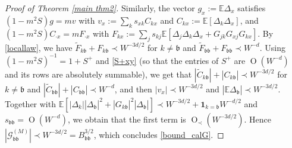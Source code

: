 \documentclass{article}
\newcommand{\1}{\mathds{1}}
\numberwithin{equation}{section}
\newcommand{\fb}{{\mathfrak b}}
\renewcommand{\cal}{\mathcal}
\newcommand{\wt}{\widetilde}
\newcommand{\E}{\mathbb{E}}
\DeclareMathOperator{\OO}{O}
\theoremstyle{plain} %
\theoremstyle{remark}
\begin{document}
\begin{proof}[Proof of Theorem \ref{main thm2}]
Similarly, the vector $g_x:=\E\Delta_x$ satisfies $(1-m^2S)g=mv$ with $v_x:=\sum_k s_{xk}C_{kx}$ and $C_{kx}:=\E[\Delta_k\Delta_x]$, and $(1-m^2S)C_{\cdot x}=mF_{\cdot x}$ with $F_{kx}:=\sum_j s_{kj}\E[\Delta_j\Delta_k\Delta_x+G_{jk}G_{xj}G_{kx}]$. By \eqref{locallaw}, we have $\wt F_{k\fb}+F_{k\fb}\prec W^{-3d/2}$ for $k\ne\fb$ and $\wt F_{\fb\fb}+F_{\fb\fb}\prec W^{-d}$. Using $(1-m^2S)^{-1}=1+S^+$ and \eqref{S+xy} (so that the entries of $S^+$ are $\OO(W^{-d})$ and its rows are absolutely summable), we get that $|\wt C_{k\fb}|+|C_{k\fb}|\prec W^{-3d/2}$ for $k\ne \fb$ and $|\wt C_{\fb\fb}|+|C_{\fb\fb}|\prec W^{-d}$, and then $|v_x|\prec W^{-3d/2}$ and $|\E\Delta_\fb|\prec W^{-3d/2}$. Together with $\E[|\Delta_k||\Delta_\fb|^2+|G_{k\fb}|^2|\Delta_\fb|]\prec W^{-3d/2}+\mathbf 1_{k=\fb}W^{-d/2}$ and $s_{\fb\fb}=\OO(W^{-d})$, we obtain that the first term is $\OO_\prec(W^{-3d/2})$. Hence $|\cal G^{(M)}_{\fb\fb}|\prec W^{-3d/2}=B_{\fb\fb}^{3/2}$, which concludes \eqref{bound_calG}.


\end{proof}
\end{document}

